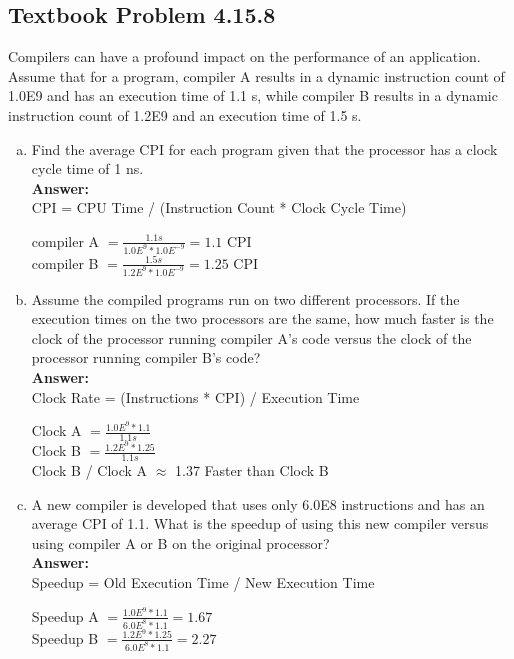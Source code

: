 \documentclass[12pt]{article}
\begin{document}
\subsection{Textbook Problem 4.15.8}
Compilers can have a profound impact on the performance of an application. Assume that for a program, compiler A results in a dynamic instruction count of 1.0E9 and has an execution time of 1.1 s, while compiler B results in a dynamic instruction count of 1.2E9 and an execution time of 1.5 s.

\begin{enumerate}[(a)]
    \item Find the average CPI for each program given that the processor has a clock cycle time of 1 ns.
    \\
    \textbf{Answer:}
    \\
    CPI = CPU Time / (Instruction Count * Clock Cycle Time)
        \begin{center}
            compiler A $ = \frac{1.1s}{1.0E^{9} * 1.0E^{-9}} = 1.1 \text{ CPI} $\\[0.25in]
            compiler B $ = \frac{1.5s}{1.2E^{9} * 1.0E^{-9}} = 1.25 \text{ CPI} $\\
        \end{center}
    
    \item Assume the compiled programs run on two different processors. If the execution times on the two processors are the same, how much faster is the clock of the processor running compiler A's code versus the clock of the processor running compiler B's code?
    \\
    \textbf{Answer:}
    \\
    Clock Rate = (Instructions * CPI) / Execution Time
        \begin{center}
            Clock A $ = \frac{1.0E^{9} * 1.1}{1.1s} $\\[0.25in]
            Clock B $ = \frac{1.2E^{9} * 1.25}{1.1s} $\\[0.25in]
            Clock B / Clock A $\approx$ 1.37 Faster than Clock B\\
        \end{center}
    
    \item A new compiler is developed that uses only 6.0E8 instructions and has an average CPI of 1.1. What is the speedup of using this new compiler versus using compiler A or B on the original processor?
    \\
    \textbf{Answer:}
    \\
    Speedup = Old Execution Time / New Execution Time
        \begin{center}
            Speedup A $ = \frac{1.0E^{9} * 1.1}{6.0E^{8} * 1.1} = 1.67 $\\[0.25in]
            Speedup B $ = \frac{1.2E^{9} * 1.25}{6.0E^{8} * 1.1} = 2.27$\\[0.25in]
        \end{center}

\end{enumerate}
\end{document}
